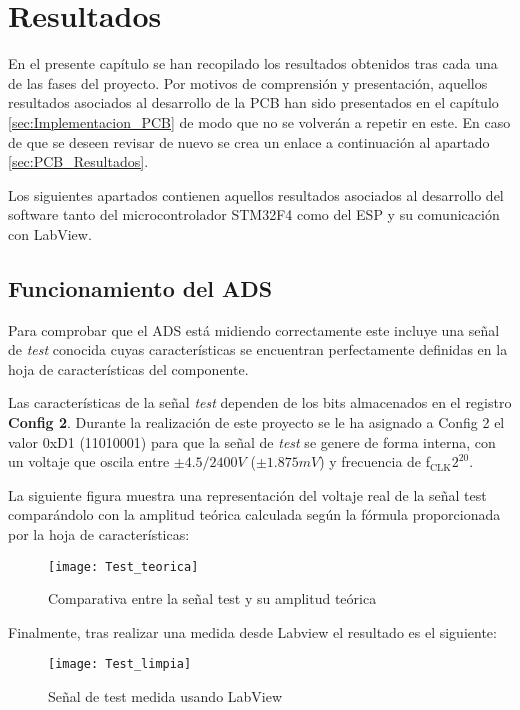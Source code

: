 \chapter{Resultados\label{sec:Resultados}}

En el presente capítulo se han recopilado los resultados obtenidos tras cada una de las fases del proyecto. Por motivos de comprensión y presentación, aquellos resultados asociados al desarrollo de la \acrshort{PCB} han sido presentados en el capítulo \ref{sec:Implementacion_PCB} de modo que no se volverán a repetir en este. En caso de que se deseen revisar de nuevo se crea un enlace a continuación al apartado \ref{sec:PCB_Resultados}.

Los siguientes apartados contienen aquellos resultados asociados al desarrollo del software tanto del microcontrolador STM32F4 como del ESP y su comunicación con LabView.

\section{Funcionamiento del ADS\label{Resultados_ADS}}

Para comprobar que el ADS está midiendo correctamente este incluye una señal de \textit{test} conocida cuyas características se encuentran perfectamente definidas en la hoja de características del componente.

Las características de la señal \textit{test} dependen de los bits almacenados en el registro \textbf{Config 2}. Durante la realización de este proyecto se le ha asignado a Config 2 el valor 0xD1 (11010001) para que la señal de \textit{test} se genere de forma interna, con un voltaje que oscila entre $\pm4.5/2400V$ ($\pm1.875mV$) y frecuencia de f$_\text{CLK}$\/$2^{20}$.

La siguiente figura muestra una representación del voltaje real de la señal test comparándolo con la amplitud teórica calculada según la fórmula proporcionada por la hoja de características:

\begin{figure} [H]
    \centering
    \texttt{[image: Test\_teorica]}
    \caption{Comparativa entre la señal test y su amplitud teórica}
    \label{fig:tes_teorica}
\end{figure}

Finalmente, tras realizar una medida desde Labview el resultado es el siguiente:

\begin{figure} [H]
    \centering
    \texttt{[image: Test\_limpia]}
    \caption{Señal de test medida usando LabView}
    \label{fig:Test_limpia}
\end{figure}

